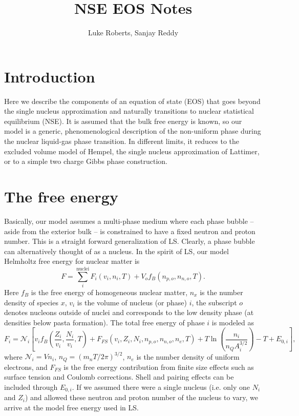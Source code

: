 \documentclass[11pt,letter]{article}
\title{NSE EOS Notes}
\author{Luke Roberts, Sanjay Reddy}
\date{} %
\begin{document}
\maketitle
\tableofcontents

\section{Introduction}
Here we describe the components of an equation of state (EOS) that goes beyond
the single nucleus approximation and naturally transitions to nuclear
statistical equilibrium (NSE).  It is assumed that the bulk free energy is
known, so our model is a generic, phenomenological description of the
non-uniform phase during the nuclear liquid-gas phase transition.  In different
limits, it reduces to the excluded volume model of Hempel, the single nucleus
approximation of Lattimer, or to a simple two charge Gibbs phase construction.  

\section{The free energy}  
Basically, our model assumes a multi-phase medium where each phase bubble --
aside from the exterior bulk -- is constrained to have a fixed neutron and
proton number.  This is a straight forward generalization of LS.  Clearly, a
phase bubble can alternatively thought of as a nucleus.  In the spirit of LS,
our model Helmholtz free energy for nuclear matter is 
\begin{equation}
F = \sum_i^{\textrm{nuclei}} F_i(v_i,n_i,T) + V_o f_{B}(n_{p,o},n_{n,o},T).
\end{equation}
Here $f_B$ is the free energy of homogeneous nuclear matter, $n_x$ is the number
density of species $x$, $v_i$ is the volume of nucleus (or phase) $i$, the
subscript $o$ denotes nucleons outside of nuclei and corresponds to the low
density phase (at densities below pasta formation).  The total free energy of
phase $i$ is modeled as 
\begin{equation}
F_i = \mathcal{N}_i \left[ v_i f_B(\frac{Z_i}{v_i},\frac{N_i}{v_i},T) 
+ F_{FS}(v_i,Z_i,N_i,n_{p,o},n_{n,o},n_e,T) + T \ln \left(\frac{n_i}{n_Q A_i^{3/2}}\right) 
- T + E_{0,i}\right],
\end{equation}   
where $\mathcal{N}_i = V n_i$, $n_Q = (m_n T / 2 \pi)^{3/2}$, $n_e$ is the
number density of uniform electrons, and $F_{FS}$ is the free energy
contribution from finite size effects such as surface tension and Coulomb
corrections.  Shell and pairing effects can be included through $E_{0,i}$.  If
we assumed there were a single nucleus (i.e. only one $N_i$ and $Z_i$) and
allowed these neutron and proton number of the nucleus to vary, we arrive at the
model free energy used in LS.  
\end{document}
